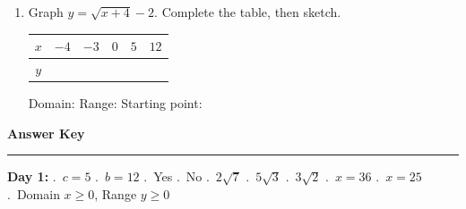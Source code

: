 \documentclass[11pt]{article}
\begin{document}
\begin{enumerate}[label=\textbf{\arabic*.}, start=10, itemsep=0pt]

  \item Graph $y = \sqrt{x + 4} - 2$. \; Complete the table, then sketch.

  \medskip
  \begin{center}
  \renewcommand{\arraystretch}{2}
  \begin{tabular}{|c|c|c|c|c|c|}
  \hline
  $x$ & $-4$ & $-3$ & $0$ & $5$ & $12$ \\
  \hline
  $y$ & & & & & \\
  \hline
  \end{tabular}
  \end{center}

  \medskip
  \begin{center}
  \end{center}

  \noindent Domain: \underline{\hspace{3cm}} \; Range: \underline{\hspace{3cm}} \; Starting point: \underline{\hspace{2cm}}

\end{enumerate}

\newpage
\begin{center}
{\Large\textbf{\textcolor{day1}{Answer Key}}}\\[4pt]
\rule{\linewidth}{1.5pt}
\end{center}

\medskip
\begin{ansbox}
\textbf{Day 1:} .~$c=5$ .~$b=12$ .~Yes .~No .~$2\sqrt{7}$ .~$5\sqrt{3}$ .~$3\sqrt{2}$ .~$x=36$ .~$x=25$ .~Domain $x\ge0$, Range $y\ge0$
\end{ansbox}
\end{document}
